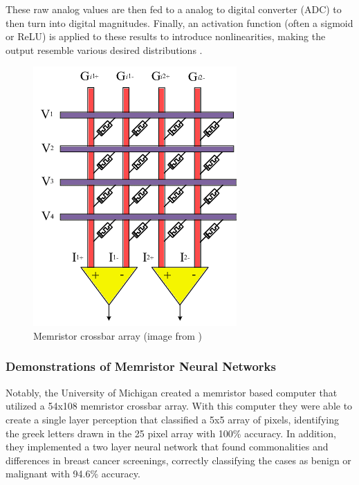 \documentclass[sigconf]{acmart}
\begin{document}
These raw analog values are then fed to a analog to digital converter
(ADC) to then turn into digital magnitudes. Finally, an activation
function (often a sigmoid or ReLU) is applied to these results to 
introduce nonlinearities, making the output resemble various desired 
distributions \cite{aguirre2024hardware}. 
\begin{figure}[H]
  \centering
  \includegraphics[width = \linewidth]{images/Neural-network-implementation-using-memristor-crossbar-arrays-a-shows-a-conventional.png}
  \caption{Memristor crossbar array (image from \cite{hassan2018real})}
\end{figure}

\subsubsection{Demonstrations of Memristor Neural Networks}
Notably, the University of Michigan created a memristor based 
computer that utilized a 54x108 memristor crossbar array. 
With this computer they were able to create a single layer perception 
that classified a 5x5 array of pixels, identifying the greek letters 
drawn in the 25 pixel array with 100\% accuracy. In addition, they 
implemented a two layer neural network that found commonalities and 
differences in breast cancer screenings, correctly classifying 
the cases as benign or malignant with 94.6\% accuracy.
\cite{cai2019fully}
\end{document}
